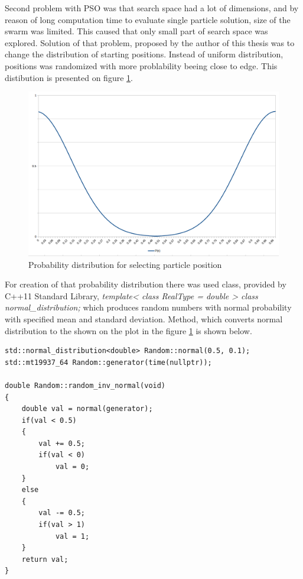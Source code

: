 Second problem with PSO was that search space had a lot of dimensions, and by reason of long computation time to evaluate single particle solution, 
size of the swarm was limited. This caused that only small part of search space was explored. Solution of that problem, 
proposed by the author of this thesis was to change the distribution of starting positions. Instead of uniform distribution, positions was randomized 
with more problability beeing close to edge. This distibution is presented on figure \ref{img_pso_imp_dist}.

\begin{figure}[ht]
	\centering
	\includegraphics[scale=0.4]{img/pso_dist.png}
	\caption{Probability distribution for selecting particle position}
	\label{img_pso_imp_dist}
\end{figure}

For creation of that probability distribution there was used class, provided by C++11 Standard Library, 
\textit{template< class RealType = double > class normal\_distribution;} which produces random numbers with normal probability
with specified mean and standard deviation. Method, which converts normal distribution to the shown on the plot in the figure \ref{img_pso_imp_dist} 
is shown below.

\begin{lstlisting}
std::normal_distribution<double> Random::normal(0.5, 0.1);
std::mt19937_64 Random::generator(time(nullptr));

double Random::random_inv_normal(void)
{
    double val = normal(generator);
    if(val < 0.5)
    {
        val += 0.5;
        if(val < 0)
            val = 0;
    }
    else
    {
        val -= 0.5;
        if(val > 1)
            val = 1;
    }
    return val;
}
\end{lstlisting}